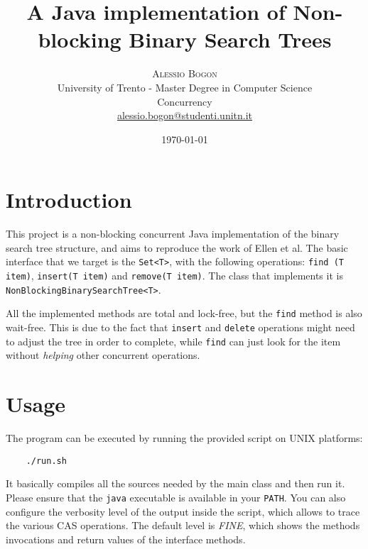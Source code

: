 \documentclass[a4paper,draft,12pt]{article}
\title{\textbf{A Java implementation of Non-blocking Binary Search Trees}} %
\author{
    \textsc{Alessio Bogon}\\[2mm] %
    \normalsize University of Trento - Master Degree in Computer Science\\ %
    \normalsize Concurrency\\
    \href{mailto:alessio.bogon@studenti.unitn.it}{alessio.bogon@studenti.unitn.it} %
}
\date{\today}
\begin{document}
\maketitle


\section{Introduction} %
\label{sec:introduction}
This project is a non-blocking concurrent Java implementation of the binary search tree structure, and aims to reproduce the work of Ellen et al\cite{ellen10}. The basic interface that we target is the \texttt{Set<T>}, with the following operations: \texttt{find (T item)}, \texttt{insert(T item)} and \texttt{remove(T item)}. The class that implements it is \texttt{Non\-Blocking\-Binary\-Search\-Tree\-<T>}.

All the implemented methods are total and lock-free, but the \texttt{find} method is also wait-free. This is due to the fact that \texttt{insert} and \texttt{delete} operations might need to adjust the tree in order to complete, while \texttt{find} can just look for the item without \emph{helping} other concurrent operations.



\section{Usage} %
\label{sec:usage}
The program can be executed by running the provided script on UNIX platforms:
\begin{verbatim}
    ./run.sh
\end{verbatim}
It basically compiles all the sources needed by the main class and then run it. Please ensure that the \texttt{java} executable is available in your \texttt{PATH}. You can also configure the verbosity level of the output inside the script, which allows to trace the various \ac{CAS} operations. The default level is \emph{FINE}, which shows the methods invocations and return values of the interface methods.
\end{document}
